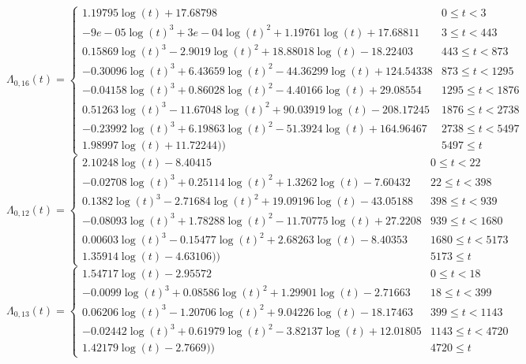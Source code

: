 \documentclass[12pt,PhD,twoside,openright]{muthesis}
\begin{document}
\begin{equation}
\Lambda_{0,16}(t)=\begin{cases} 1.19795\log(t)+17.68798 & 0 \le t < 3 \\ -9e-05\log(t)^3+3e-04\log(t)^2+1.19761\log(t)+17.68811 & 3 \le t < 443 \\ 0.15869\log(t)^3-2.9019\log(t)^2+18.88018\log(t)-18.22403 & 443 \le t < 873 \\ -0.30096\log(t)^3+6.43659\log(t)^2-44.36299\log(t)+124.54338 & 873 \le t < 1295 \\ -0.04158\log(t)^3+0.86028\log(t)^2-4.40166\log(t)+29.08554 & 1295 \le t < 1876 \\ 0.51263\log(t)^3-11.67048\log(t)^2+90.03919\log(t)-208.17245 & 1876 \le t < 2738 \\ -0.23992\log(t)^3+6.19863\log(t)^2-51.3924\log(t)+164.96467 & 2738 \le t < 5497 \\ 1.98997\log(t)+11.72244)) & 5497 \le t \label{eq:CH-Five-16}\end{cases}
\end{equation}
\begin{equation}
\Lambda_{0,12}(t)=\begin{cases} 2.10248\log(t)-8.40415 & 0 \le t < 22 \\ -0.02708\log(t)^3+0.25114\log(t)^2+1.3262\log(t)-7.60432 & 22 \le t < 398 \\ 0.1382\log(t)^3-2.71684\log(t)^2+19.09196\log(t)-43.05188 & 398 \le t < 939 \\ -0.08093\log(t)^3+1.78288\log(t)^2-11.70775\log(t)+27.2208 & 939 \le t < 1680 \\ 0.00603\log(t)^3-0.15477\log(t)^2+2.68263\log(t)-8.40353 & 1680 \le t < 5173 \\ 1.35914\log(t)-4.63106)) & 5173 \le t \label{eq:CH-Five-12}\end{cases}
\end{equation}
\begin{equation}
\Lambda_{0,13}(t)=\begin{cases} 1.54717\log(t)-2.95572 & 0 \le t < 18 \\ -0.0099\log(t)^3+0.08586\log(t)^2+1.29901\log(t)-2.71663 & 18 \le t < 399 \\ 0.06206\log(t)^3-1.20706\log(t)^2+9.04226\log(t)-18.17463 & 399 \le t < 1143 \\ -0.02442\log(t)^3+0.61979\log(t)^2-3.82137\log(t)+12.01805 & 1143 \le t < 4720 \\ 1.42179\log(t)-2.7669)) & 4720 \le t \label{eq:CH-Five-13}\end{cases}
\end{equation}
\end{document}
